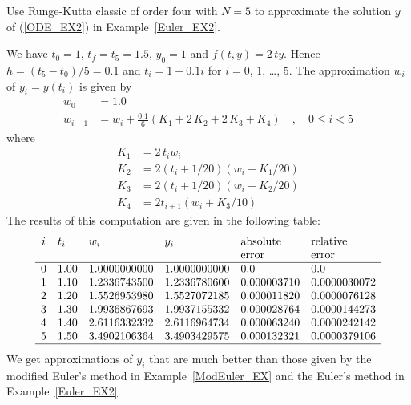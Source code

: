 \begin{egg}
Use Runge-Kutta classic of order four with $N=5$ to approximate the
solution $y$ of (\ref{ODE_EX2}) in Example~\ref{Euler_EX2}.

We have $t_0=1$, $t_f= t_5 =1.5$, $y_0=1$ and $f(t,y) = 2\,ty$.  Hence
$h = (t_5-t_0)/5 = 0.1$ and $t_i = 1 + 0.1i$ for $i=0$, $1$, \ldots,
$5$.  The approximation $w_i$ of $y_i = y(t_i)$ is given by
\begin{align*}
w_0 & = 1.0 \\
w_{i+1} & = w_i + \frac{0.1}{6}(K_1 + 2\,K_2 + 2\,K_3 + K_4) \quad,
\quad 0 \leq i < 5
\end{align*}
where
\begin{align*}
K_1 &=2\, t_i w_i \\
K_2 &=2(t_i + 1/20)(w_i + K_1/20) \\
K_3 &=2(t_i + 1/20)(w_i + K_2/20) \\
K_4 &=2t_{i+1}(w_i+ K_3/10)
\end{align*}
The results of this computation are given in the following table:
\[
\begin{array}{clllll}
i & t_i & w_i & y_i & \text{absolute} & \text{relative} \\
 & & & & \text{error} & \text{error} \\
\hline
0 & 1.00 & 1.0000000000 & 1.0000000000 & 0.0 & 0.0 \\
1 & 1.10 & 1.2336743500 & 1.2336780600 & 0.000003710 & 0.0000030072 \\
2 & 1.20 & 1.5526953980 & 1.5527072185 & 0.000011820 & 0.0000076128 \\
3 & 1.30 & 1.9936867693 & 1.9937155332 & 0.000028764 & 0.0000144273 \\
4 & 1.40 & 2.6116332332 & 2.6116964734 & 0.000063240 & 0.0000242142 \\
5 & 1.50 & 3.4902106364 & 3.4903429575 & 0.000132321 & 0.0000379106 \\
\hline
\end{array}
\]
We get approximations of $y_i$ that are much better than those given by
the modified Euler's method in Example~\ref{ModEuler_EX} and the
Euler's method in Example~\ref{Euler_EX2}.
\end{egg}

